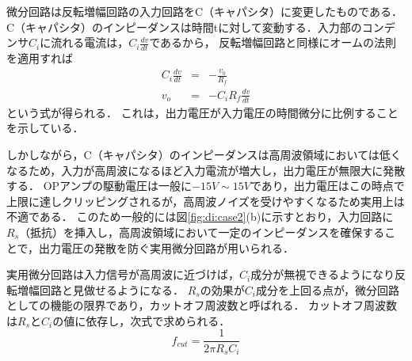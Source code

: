 \documentclass[dvipdfmx,titlepage,a4j]{jsarticle}  %
\begin{document}
微分回路は反転増幅回路の入力回路をC（キャパシタ）に変更したものである．
C（キャパシタ）のインピーダンスは時間tに対して変動する．入力部のコンデンサ$C_i$に流れる電流は，$C_i\frac{dv}{dt}$であるから，
反転増幅回路と同様にオームの法則を適用すれば
\begin{eqnarray}
  C_i\frac{dv}{dt} &=& -\frac{v_0}{R_f}\\
  v_{o} &=& -C_i R_f\frac{dv}{dt}
\end{eqnarray}
という式が得られる．
これは，出力電圧が入力電圧の時間微分に比例することを示している．

しかしながら，C（キャパシタ）のインピーダンスは高周波領域においては低くなるため，入力が高周波になるほど入力電流が増大し，出力電圧が無限大に発散する．
OPアンプの駆動電圧は一般に$-15V \sim 15V$であり，出力電圧はこの時点で上限に達しクリッピングされるが，高周波ノイズを受けやすくなるため実用上は不適である．
このため一般的には図\ref{fig:di:case2}(b)に示すとおり，入力回路に$R_s$（抵抗）を挿入し，高周波領域において一定のインピーダンスを確保することで，出力電圧の発散を防ぐ実用微分回路が用いられる．

実用微分回路は入力信号が高周波に近づけば，$C_i$成分が無視できるようになり反転増幅回路と見做せるようになる．
$R_s$の効果が$C_i$成分を上回る点が，微分回路としての機能の限界であり，カットオフ周波数と呼ばれる．
カットオフ周波数は$R_s$と$C_i$の値に依存し，次式で求められる．
\begin{equation}
  f_{cut} = \frac{1}{2\pi R_s C_i}
\end{equation}
\end{document}
